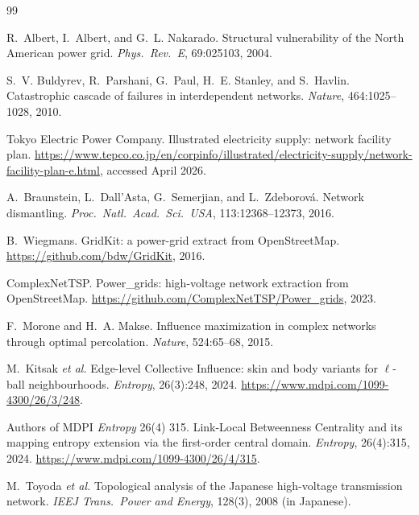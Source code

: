 \documentclass[11pt,a4paper]{article}
\begin{document}
\begin{thebibliography}{99}
\raggedright

R.~Albert, I.~Albert, and G.~L. Nakarado.
\newblock Structural vulnerability of the North American power grid.
\newblock \emph{Phys.\ Rev.\ E}, 69:025103, 2004.

S.~V. Buldyrev, R.~Parshani, G.~Paul, H.~E. Stanley, and S.~Havlin.
\newblock Catastrophic cascade of failures in interdependent networks.
\newblock \emph{Nature}, 464:1025--1028, 2010.

Tokyo Electric Power Company.
\newblock Illustrated electricity supply: network facility plan.
\newblock \url{https://www.tepco.co.jp/en/corpinfo/illustrated/electricity-supply/network-facility-plan-e.html},
accessed April 2026.

A.~Braunstein, L.~Dall'Asta, G.~Semerjian, and L.~Zdeborov\'a.
\newblock Network dismantling.
\newblock \emph{Proc.\ Natl.\ Acad.\ Sci.\ USA}, 113:12368--12373, 2016.

B.~Wiegmans.
\newblock GridKit: a power-grid extract from OpenStreetMap.
\newblock \url{https://github.com/bdw/GridKit}, 2016.

ComplexNetTSP.
\newblock Power\_grids: high-voltage network extraction from OpenStreetMap.
\newblock \url{https://github.com/ComplexNetTSP/Power_grids}, 2023.

F.~Morone and H.~A. Makse.
\newblock Influence maximization in complex networks through optimal
percolation.
\newblock \emph{Nature}, 524:65--68, 2015.

M.~Kitsak \emph{et al.}
\newblock Edge-level Collective Influence: skin and body variants for
\(\ell\)-ball neighbourhoods.
\newblock \emph{Entropy}, 26(3):248, 2024.
\newblock \url{https://www.mdpi.com/1099-4300/26/3/248}.

Authors of MDPI \emph{Entropy} 26(4) 315.
\newblock Link-Local Betweenness Centrality and its mapping entropy
extension via the first-order central domain.
\newblock \emph{Entropy}, 26(4):315, 2024.
\newblock \url{https://www.mdpi.com/1099-4300/26/4/315}.

M.~Toyoda \emph{et al.}
\newblock Topological analysis of the Japanese high-voltage transmission
network.
\newblock \emph{IEEJ Trans.\ Power and Energy}, 128(3), 2008
(in Japanese).

\end{thebibliography}
\end{document}
